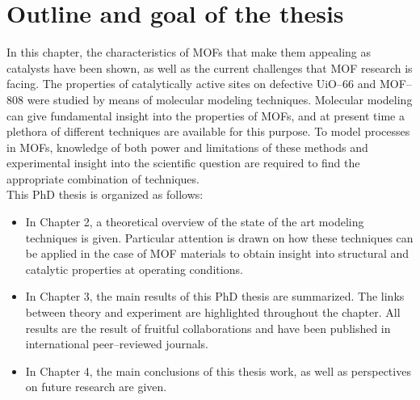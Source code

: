 \section{Outline and goal of the thesis}
In this chapter, the characteristics of MOFs that make them appealing as catalysts have been shown, as well as the current challenges that MOF research is facing. The properties of catalytically active sites on defective UiO--66 and MOF--808 were studied by means of molecular modeling techniques. Molecular modeling can give fundamental insight into the properties of MOFs, and at present time a plethora of different techniques are available for this purpose. To model processes in MOFs, knowledge of both power and limitations of these methods and experimental insight into the scientific question are required to find the appropriate combination of techniques.\\
This PhD thesis is organized as follows:
\begin{itemize}
\item In Chapter 2, a theoretical overview of the state of the art modeling techniques is given. Particular attention is drawn on how these techniques can be applied in the case of MOF materials to obtain insight into structural and catalytic properties at operating conditions.
\item In Chapter 3, the main results of this PhD thesis are summarized. The links between theory and experiment are highlighted throughout the chapter. All results are the result of fruitful collaborations and have been published in international peer--reviewed journals. 
\item In Chapter 4, the main conclusions of this thesis work, as well as perspectives on future research are given.
\end{itemize}

\clearpage{\pagestyle{empty}\cleardoublepage}
